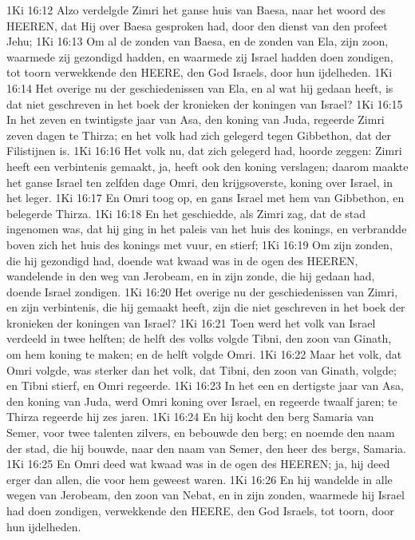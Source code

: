 1Ki 16:12  Alzo verdelgde Zimri het ganse huis van Baesa, naar het woord des HEEREN, dat Hij over Baesa gesproken had, door den dienst van den profeet Jehu;
1Ki 16:13  Om al de zonden van Baesa, en de zonden van Ela, zijn zoon, waarmede zij gezondigd hadden, en waarmede zij Israel hadden doen zondigen, tot toorn verwekkende den HEERE, den God Israels, door hun ijdelheden.
1Ki 16:14  Het overige nu der geschiedenissen van Ela, en al wat hij gedaan heeft, is dat niet geschreven in het boek der kronieken der koningen van Israel?
1Ki 16:15  In het zeven en twintigste jaar van Asa, den koning van Juda, regeerde Zimri zeven dagen te Thirza; en het volk had zich gelegerd tegen Gibbethon, dat der Filistijnen is.
1Ki 16:16  Het volk nu, dat zich gelegerd had, hoorde zeggen: Zimri heeft een verbintenis gemaakt, ja, heeft ook den koning verslagen; daarom maakte het ganse Israel ten zelfden dage Omri, den krijgsoverste, koning over Israel, in het leger.
1Ki 16:17  En Omri toog op, en gans Israel met hem van Gibbethon, en belegerde Thirza.
1Ki 16:18  En het geschiedde, als Zimri zag, dat de stad ingenomen was, dat hij ging in het paleis van het huis des konings, en verbrandde boven zich het huis des konings met vuur, en stierf;
1Ki 16:19  Om zijn zonden, die hij gezondigd had, doende wat kwaad was in de ogen des HEEREN, wandelende in den weg van Jerobeam, en in zijn zonde, die hij gedaan had, doende Israel zondigen.
1Ki 16:20  Het overige nu der geschiedenissen van Zimri, en zijn verbintenis, die hij gemaakt heeft, zijn die niet geschreven in het boek der kronieken der koningen van Israel?
1Ki 16:21  Toen werd het volk van Israel verdeeld in twee helften; de helft des volks volgde Tibni, den zoon van Ginath, om hem koning te maken; en de helft volgde Omri.
1Ki 16:22  Maar het volk, dat Omri volgde, was sterker dan het volk, dat Tibni, den zoon van Ginath, volgde; en Tibni stierf, en Omri regeerde.
1Ki 16:23  In het een en dertigste jaar van Asa, den koning van Juda, werd Omri koning over Israel, en regeerde twaalf jaren; te Thirza regeerde hij zes jaren.
1Ki 16:24  En hij kocht den berg Samaria van Semer, voor twee talenten zilvers, en bebouwde den berg; en noemde den naam der stad, die hij bouwde, naar den naam van Semer, den heer des bergs, Samaria.
1Ki 16:25  En Omri deed wat kwaad was in de ogen des HEEREN; ja, hij deed erger dan allen, die voor hem geweest waren.
1Ki 16:26  En hij wandelde in alle wegen van Jerobeam, den zoon van Nebat, en in zijn zonden, waarmede hij Israel had doen zondigen, verwekkende den HEERE, den God Israels, tot toorn, door hun ijdelheden.
